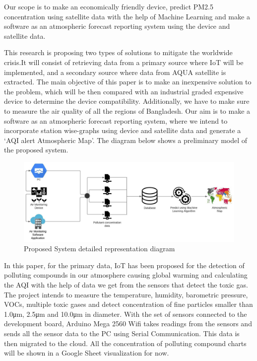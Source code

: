 Our scope is to make an economically friendly device, predict PM2.5 concentration using satellite data with the help of Machine Learning and make a software as an atmospheric forecast reporting system using the device and satellite data.

This research is proposing two types of solutions to mitigate the worldwide crisis.It will consist of retrieving data from a primary source where IoT will be implemented, and a secondary source where data from AQUA satellite is extracted. The main objective of this paper is to make an inexpensive solution to the problem, which will be then compared with an industrial graded expensive device to determine the device compatibility. Additionally, we have to make sure to measure the air quality of all the regions of Bangladesh. Our aim is to make a software as an atmospheric forecast reporting system, where we intend to incorporate station wise-graphs using device and satellite data and generate a ‘AQI alert Atmospheric Map’. The diagram below shows a preliminary model of the proposed system.

\begin{figure} [H]
    \centering
    \includegraphics[width=\textwidth]{images/1_1_System Design AQM.jpeg}
    \caption{Proposed System detailed representation diagram}
    \label{fig:System Design AQM}
\end{figure}

In this paper, for the primary data, IoT has been proposed for the detection of polluting compounds in our atmosphere causing global warming and calculating the AQI with the help of data we get from the sensors that detect the toxic gas. The project intends to measure the temperature, humidity, barometric pressure, VOCs, multiple toxic gases and detect concentration of fine particles smaller than 1.0μm, 2.5μm and 10.0μm in diameter. With the set of sensors connected to the development board, Arduino Mega 2560 Wifi takes readings from the sensors and sends all the sensor data to the PC using Serial Communication. This data is then migrated to the cloud. All the concentration of polluting compound charts will be shown in a Google Sheet visualization for now. 

